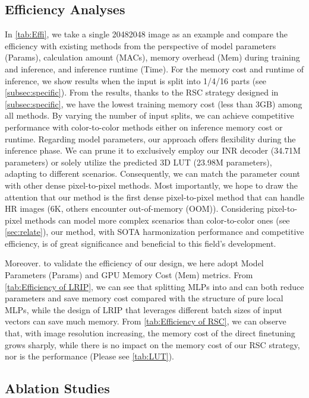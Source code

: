 \documentclass[10pt,journal,twocolumn,twoside]{IEEEtran}
\begin{document}
\subsection{Efficiency Analyses}
\label{subsec:efficiency}

In \cref{tab:Effi}, we take a single 20482048 image as an example and compare the efficiency with existing methods from the perspective of model parameters (Params), calculation amount (MACs), memory overhead (Mem) during training and inference, and inference runtime (Time). For the memory cost and runtime of inference, we show results when the input is split into 1/4/16 parts (see \cref{subsec:specific}). From the results, thanks to the RSC strategy designed in \cref{subsec:specific}, we have the lowest training memory cost (less than 3GB) among all methods. By varying the number of input splits, we can achieve competitive performance with color-to-color methods either on inference memory cost or runtime. Regarding model parameters, our approach offers flexibility during the inference phase. We can prune it to exclusively employ our INR decoder (34.71M parameters) or solely utilize the predicted 3D LUT (23.98M parameters), adapting to different scenarios. Consequently, we can match the parameter count with other dense pixel-to-pixel methods. Most importantly, we hope to draw the attention that our method is the first dense pixel-to-pixel method that can handle HR images (6K, others encounter out-of-memory (OOM)). Considering pixel-to-pixel methods can model more complex scenarios than color-to-color ones (see \cref{sec:relate}), our method, with SOTA harmonization performance and competitive efficiency, is of great significance and beneficial to this field's development.

Moreover. to validate the efficiency of our design, we here adopt Model Parameters (Params) and GPU Memory Cost (Mem) metrics. From \cref{tab:Efficiency of LRIP}, we can see that splitting MLPs into  and  can both reduce parameters and save memory cost compared with the structure of pure local MLPs, while the design of LRIP that leverages different batch sizes of input vectors can save much memory. From \cref{tab:Efficiency of RSC}, we can observe that, with image resolution increasing, the memory cost of the direct finetuning grows sharply, while there is no impact on the memory cost of our RSC strategy, nor is the performance (Please see \cref{tab:LUT}). 



\subsection{Ablation Studies}
\label{subsec:ablation}
\end{document}
